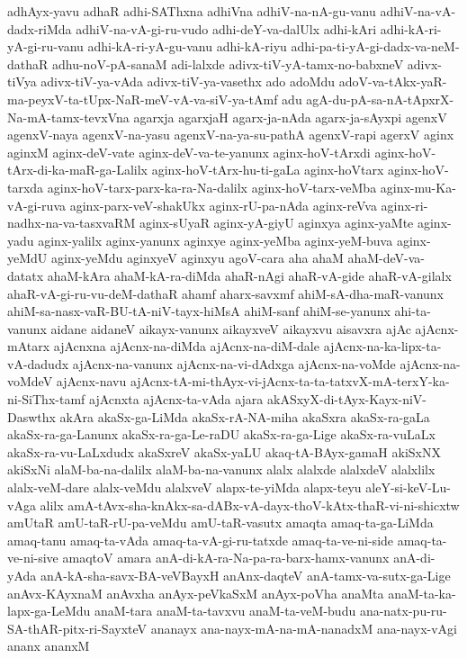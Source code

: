 {adhAyx-yavu
adhaR
adhi-SAThxna
adhiVna
adhiV-na-nA-gu-vanu
adhiV-na-vA-dadx-riMda
adhiV-na-vA-gi-ru-vudo
adhi-deY-va-dalUlx
adhi-kAri
adhi-kA-ri-yA-gi-ru-vanu
adhi-kA-ri-yA-gu-vanu
adhi-kA-riyu
adhi-pa-ti-yA-gi-dadx-va-neM-dathaR
adhu-noV-pA-sanaM
adi-lalxde
adivx-tiV-yA-tamx-no-babxneV
adivx-tiVya
adivx-tiV-ya-vAda
adivx-tiV-ya-vasethx
ado
adoMdu
adoV-va-tAkx-yaR-ma-peyxV-ta-tUpx-NaR-meV-vA-va-siV-ya-tAmf
adu
agA-du-pA-sa-nA-tApxrX-Na-mA-tamx-tevxVna
agarxja
agarxjaH
agarx-ja-nAda
agarx-ja-sAyxpi
agenxV
agenxV-naya
agenxV-na-yasu
agenxV-na-ya-su-pathA
agenxV-rapi
agerxV
aginx
aginxM
aginx-deV-vate
aginx-deV-va-te-yanunx
aginx-hoV-tArxdi
aginx-hoV-tArx-di-ka-maR-ga-Lalilx
aginx-hoV-tArx-hu-ti-gaLa
aginx-hoVtarx
aginx-hoV-tarxda
aginx-hoV-tarx-parx-ka-ra-Na-dalilx
aginx-hoV-tarx-veMba
aginx-mu-Ka-vA-gi-ruva
aginx-parx-veV-shakUkx
aginx-rU-pa-nAda
aginx-reVva
aginx-ri-nadhx-na-va-tasxvaRM
aginx-sUyaR
aginx-yA-giyU
aginxya
aginx-yaMte
aginx-yadu
aginx-yalilx
aginx-yanunx
aginxye
aginx-yeMba
aginx-yeM-buva
aginx-yeMdU
aginx-yeMdu
aginxyeV
aginxyu
agoV-cara
aha
ahaM
ahaM-deV-va-datatx
ahaM-kAra
ahaM-kA-ra-diMda
ahaR-nAgi
ahaR-vA-gide
ahaR-vA-gilalx
ahaR-vA-gi-ru-vu-deM-dathaR
ahamf
aharx-savxmf
ahiM-sA-dha-maR-vanunx
ahiM-sa-nasx-vaR-BU-tA-niV-tayx-hiMsA
ahiM-sanf
ahiM-se-yanunx
ahi-ta-vanunx
aidane
aidaneV
aikayx-vanunx
aikayxveV
aikayxvu
aisavxra
ajAc
ajAcnx-mAtarx
ajAcnxna
ajAcnx-na-diMda
ajAcnx-na-diM-dale
ajAcnx-na-ka-lipx-ta-vA-dadudx
ajAcnx-na-vanunx
ajAcnx-na-vi-dAdxga
ajAcnx-na-voMde
ajAcnx-na-voMdeV
ajAcnx-navu
ajAcnx-tA-mi-thAyx-vi-jAcnx-ta-ta-tatxvX-mA-terxY-ka-ni-SiThx-tamf
ajAcnxta
ajAcnx-ta-vAda
ajara
akASxyX-di-tAyx-Kayx-niV-Daswthx
akAra
akaSx-ga-LiMda
akaSx-rA-NA-miha
akaSxra
akaSx-ra-gaLa
akaSx-ra-ga-Lanunx
akaSx-ra-ga-Le-raDU
akaSx-ra-ga-Lige
akaSx-ra-vuLaLx
akaSx-ra-vu-LaLxdudx
akaSxreV
akaSx-yaLU
akaq-tA-BAyx-gamaH
akiSxNX
akiSxNi
alaM-ba-na-dalilx
alaM-ba-na-vanunx
alalx
alalxde
alalxdeV
alalxlilx
alalx-veM-dare
alalx-veMdu
alalxveV
alapx-te-yiMda
alapx-teyu
aleY-si-keV-Lu-vAga
alilx
amA-tAvx-sha-knAkx-sa-dABx-vA-dayx-thoV-kAtx-thaR-vi-ni-shicxtw
amUtaR
amU-taR-rU-pa-veMdu
amU-taR-vasutx
amaqta
amaq-ta-ga-LiMda
amaq-tanu
amaq-ta-vAda
amaq-ta-vA-gi-ru-tatxde
amaq-ta-ve-ni-side
amaq-ta-ve-ni-sive
amaqtoV
amara
anA-di-kA-ra-Na-pa-ra-barx-hamx-vanunx
anA-di-yAda
anA-kA-sha-savx-BA-veVBayxH
anAnx-daqteV
anA-tamx-va-sutx-ga-Lige
anAvx-KAyxnaM
anAvxha
anAyx-peVkaSxM
anAyx-poVha
anaMta
anaM-ta-ka-lapx-ga-LeMdu
anaM-tara
anaM-ta-tavxvu
anaM-ta-veM-budu
ana-natx-pu-ru-SA-thAR-pitx-ri-SayxteV
ananayx
ana-nayx-mA-na-mA-nanadxM
ana-nayx-vAgi
ananx
ananxM
}

